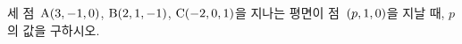 세 점~$\mathrm{A}(3{,}\mkern3mu\mathopen{}-1{,}\mkern3mu\mathopen{}0)$, $\mathrm{B}(2{,}\mkern3mu\mathopen{}1{,}\mkern3mu\mathopen{}-1)$, $\mathrm{C}(-2{,}\mkern3mu\mathopen{}0{,}\mkern3mu\mathopen{}1)$을 지나는 평면이 점~$(p{,}\mkern3mu\mathopen{}1{,}\mkern3mu\mathopen{}0)$을 지날 때, $p$의 값을 구하시오.
